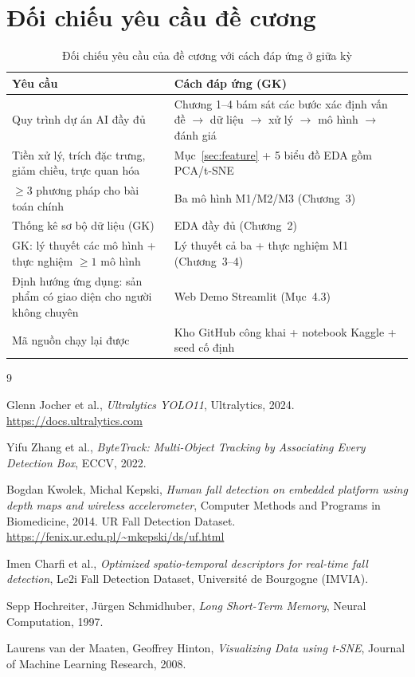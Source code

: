 \documentclass[fontsize=13pt,a4paper,oneside,DIV=calc,chapterprefix=true]{scrbook}
\begin{document}
\section{Đối chiếu yêu cầu đề cương}
\begin{table}[H]
\centering
\caption{Đối chiếu yêu cầu của đề cương với cách đáp ứng ở giữa kỳ}
\label{tab:req}
\small
\begin{tabularx}{\linewidth}{@{}p{6.2cm}X@{}}
\toprule
\textbf{Yêu cầu} & \textbf{Cách đáp ứng (GK)} \\
\midrule
Quy trình dự án AI đầy đủ & Chương 1--4 bám sát các bước xác định vấn đề $\rightarrow$ dữ liệu $\rightarrow$ xử lý $\rightarrow$ mô hình $\rightarrow$ đánh giá \\
Tiền xử lý, trích đặc trưng, giảm chiều, trực quan hóa & Mục~\ref{sec:feature} + 5 biểu đồ EDA gồm PCA/t-SNE \\
$\ge 3$ phương pháp cho bài toán chính & Ba mô hình M1/M2/M3 (Chương~3) \\
Thống kê sơ bộ dữ liệu (GK) & EDA đầy đủ (Chương~2) \\
GK: lý thuyết các mô hình + thực nghiệm $\ge 1$ mô hình & Lý thuyết cả ba + thực nghiệm M1 (Chương~3--4) \\
Định hướng ứng dụng: sản phẩm có giao diện cho người không chuyên & Web Demo Streamlit (Mục~4.3) \\
Mã nguồn chạy lại được & Kho GitHub công khai + notebook Kaggle + seed cố định \\
\bottomrule
\end{tabularx}
\end{table}

\backmatter
\begin{thebibliography}{9}

 Glenn Jocher et al., \textit{Ultralytics YOLO11}, Ultralytics, 2024. \url{https://docs.ultralytics.com}

 Yifu Zhang et al., \textit{ByteTrack: Multi-Object Tracking by Associating Every Detection Box}, ECCV, 2022.

 Bogdan Kwolek, Michal Kepski, \textit{Human fall detection on embedded platform using depth maps and wireless accelerometer}, Computer Methods and Programs in Biomedicine, 2014. UR Fall Detection Dataset. \url{https://fenix.ur.edu.pl/~mkepski/ds/uf.html}

 Imen Charfi et al., \textit{Optimized spatio-temporal descriptors for real-time fall detection}, Le2i Fall Detection Dataset, Université de Bourgogne (IMVIA).

 Sepp Hochreiter, Jürgen Schmidhuber, \textit{Long Short-Term Memory}, Neural Computation, 1997.

 Laurens van der Maaten, Geoffrey Hinton, \textit{Visualizing Data using t-SNE}, Journal of Machine Learning Research, 2008.

\end{thebibliography}
\end{document}
